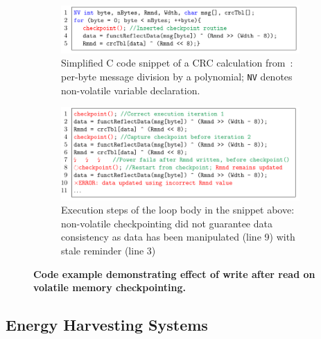 
\begin{figure}
	\begin{subfigure}[t]{\linewidth}
		\centering \includegraphics[width=\columnwidth]{figures/crc_example}
		\caption{Simplified C code snippet of a CRC calculation from~\cite{hicks_mibench2_2016}: per-byte message division by a polynomial; \texttt{NV} denotes non-volatile variable declaration.}\label{fig:crc_example}
	\end{subfigure}
	\begin{subfigure}[t]{\linewidth}
		\centering \includegraphics[width=\columnwidth]{figures/crc_example_war}
		\caption{Execution steps of the loop body in the snippet above: non-volatile checkpointing did not guarantee data consistency as data has been manipulated (line 9) with stale reminder (line 3)}\label{fig:crc_example_war}
	\end{subfigure}
	\caption{\textbf{Code example demonstrating effect of write after read on volatile memory checkpointing.}}\label{fig:code_demo_incosistency}
\end{figure}

\subsection{Energy Harvesting Systems}
\label{sec:background_harvesting}

